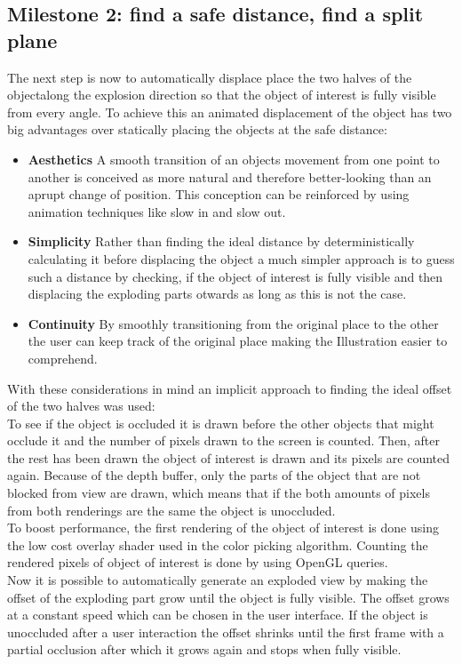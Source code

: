 \subsection{Milestone 2: find a safe distance, find a split plane} 
The next step is now to automatically displace place the two halves of the objectalong the explosion direction so that the object of interest is fully visible from every angle. To achieve this an animated displacement of the object has two big advantages over statically placing the objects at the safe distance:\\
\begin{itemize}
\item \textbf{Aesthetics} A smooth transition of an objects movement from one point to another is conceived as more natural and therefore better-looking than an aprupt change of position. This conception can be reinforced by using animation techniques like slow in and slow out.\cite{misc:siggraphAnim}
\item \textbf{Simplicity} Rather than finding the ideal distance by deterministically calculating it before displacing the object a much simpler approach is to guess such a distance by checking, if the object of interest is fully visible and then displacing the exploding parts otwards as long as this is not the case.
\item \textbf{Continuity} By smoothly transitioning from the original place to the other the user can keep track of the original place making the Illustration easier to comprehend.
\end{itemize}
With these considerations in mind an implicit approach to finding the ideal offset of the two halves was used:\\
To see if the object is occluded it is drawn before the other objects that might occlude it and the number of pixels drawn to the screen is counted. Then, after the rest has been drawn the object of interest is drawn and its pixels are counted again. Because of the depth buffer, only the parts of the object that are not blocked from view are drawn, which means that if the both amounts of pixels from both renderings are the same the object is unoccluded.\\
To boost performance, the first rendering of the object of interest is done using the low cost overlay shader used in the color picking algorithm. Counting the rendered pixels of object of interest is done by using OpenGL queries. \\
Now it is possible to automatically generate an exploded view by making the offset of the exploding part grow until the object is fully visible. The offset grows at a constant speed which can be chosen in the user interface. If the object is unoccluded after a user interaction the offset shrinks until the first frame with a partial occlusion after which it grows again and stops when fully visible.\\ 
